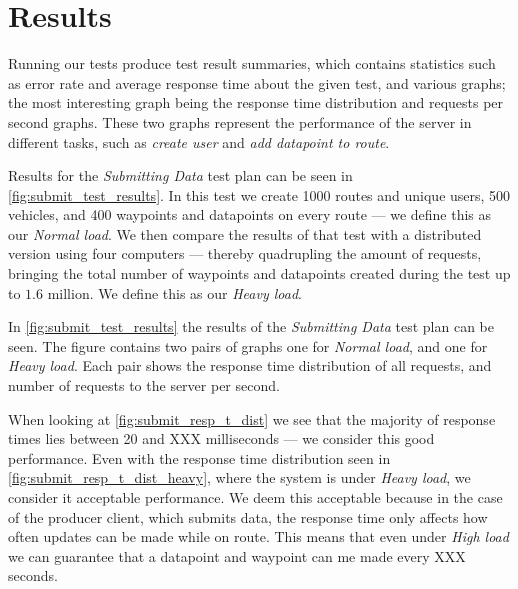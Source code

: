 \section{Results}
Running our tests produce test result summaries, which contains statistics such as error rate and average response time about the given test, and various graphs;
the most interesting graph being the response time distribution and requests per second graphs.
These two graphs represent the performance of the server in different tasks, such as \textit{create user} and \textit{add datapoint to route}.

Results for the \textit{Submitting Data} test plan can be seen in \cref{fig:submit_test_results}.
In this test we create 1000 routes and unique users, 500 vehicles, and 400 waypoints and datapoints on every route --- we define this as our \textit{Normal load}.
We then compare the results of that test with a distributed version using four computers --- thereby quadrupling the amount of requests, bringing the total number of waypoints and datapoints created during the test up to $1.6$ million.
We define this as our \textit{Heavy load}.

\bigskip
In \cref{fig:submit_test_results} the results of the \textit{Submitting Data} test plan can be seen.
The figure contains two pairs of graphs one for \textit{Normal load}, and one for \textit{Heavy load}.
Each pair shows the response time distribution of all requests, and number of requests to the server per second.

When looking at \cref{fig:submit_resp_t_dist} we see that the majority of response times lies between 20 and XXX milliseconds --- we consider this good performance.
Even with the response time distribution seen in \cref{fig:submit_resp_t_dist_heavy}, where the system is under \textit{Heavy load}, we consider it acceptable performance.
We deem this acceptable because in the case of the producer client, which submits data, the response time only affects how often updates can be made while on route.
This means that even under \textit{High load} we can guarantee that a datapoint and waypoint can me made every XXX seconds.

